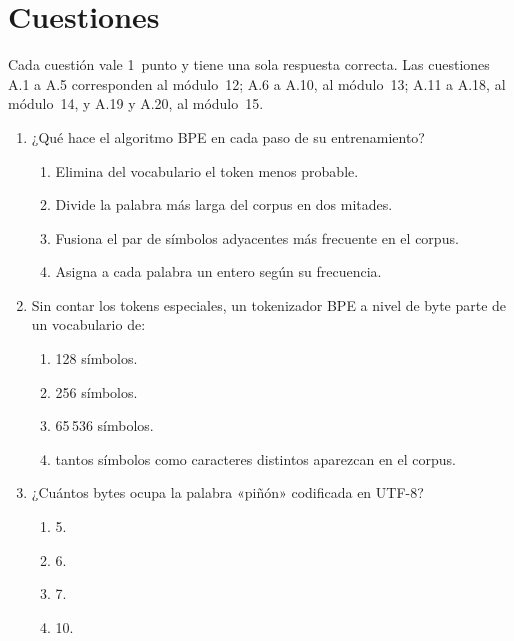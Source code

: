 \chapter{Cuestiones}
\label{chap:parteA}

Cada cuestión vale 1~punto y tiene una sola respuesta correcta. Las cuestiones A.1 a A.5 corresponden al módulo~12; A.6 a A.10, al módulo~13; A.11 a A.18, al módulo~14, y A.19 y A.20, al módulo~15.

\begin{enumerate}[label=\textbf{A.\arabic*.},ref=A.\arabic*,leftmargin=2.6em,itemsep=8pt]

\item\label{q:bpe-paso} ¿Qué hace el algoritmo BPE en cada paso de su entrenamiento? \punto
\begin{enumerate}[label=(\alph*)]
  \item Elimina del vocabulario el token menos probable.
  \item Divide la palabra más larga del corpus en dos mitades.
  \item Fusiona el par de símbolos adyacentes más frecuente en el corpus.
  \item Asigna a cada palabra un entero según su frecuencia.
\end{enumerate}

\item\label{q:bytes} Sin contar los tokens especiales, un tokenizador BPE a nivel de byte parte de un vocabulario de: \punto
\begin{enumerate}[label=(\alph*)]
  \item 128 símbolos.
  \item 256 símbolos.
  \item 65\,536 símbolos.
  \item tantos símbolos como caracteres distintos aparezcan en el corpus.
\end{enumerate}

\item\label{q:pinon} ¿Cuántos bytes ocupa la palabra «piñón» codificada en UTF-8? \punto
\begin{enumerate}[label=(\alph*)]
  \item 5.
  \item 6.
  \item 7.
  \item 10.
\end{enumerate}


\end{enumerate}
